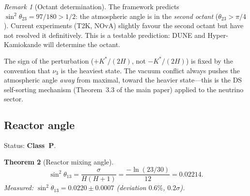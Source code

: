 \documentclass[11pt,a4paper]{article}
\newtheorem{theorem}{Theorem}[section]
\theoremstyle{definition}
\theoremstyle{remark}
\newtheorem{remark}[theorem]{Remark}
\begin{document}
\begin{remark}[Octant determination]\label{rem:octant}
The framework predicts $\sin^2\theta_{23} = 97/180 > 1/2$: the atmospheric angle is in the \emph{second octant} ($\theta_{23} > \pi/4$). Current experiments (T2K, NOvA) slightly favour the second octant but have not resolved it definitively. This is a testable prediction: DUNE and Hyper-Kamiokande will determine the octant.

The sign of the perturbation ($+K^*/(2H)$, not $-K^*/(2H)$) is fixed by the convention that $\nu_3$ is the heaviest state. The vacuum conflict always pushes the atmospheric angle \emph{away} from maximal, toward the heavier state---this is the DS self-sorting mechanism (Theorem~3.3 of the main paper) applied to the neutrino sector.
\end{remark}


\subsection{Reactor angle}\label{sec:reactor}

Status: \textbf{Class~P}.

\begin{theorem}[Reactor mixing angle]\label{thm:theta13}
\begin{equation}\label{eq:theta13}
\sin^2\theta_{13} = \frac{\sigma}{H(H+1)} = \frac{-\ln(23/30)}{12} = 0.02214.
\end{equation}
Measured: $\sin^2\theta_{13} = 0.0220 \pm 0.0007$ (deviation $0.6\%$, $0.2\sigma$).
\end{theorem}
\end{document}

